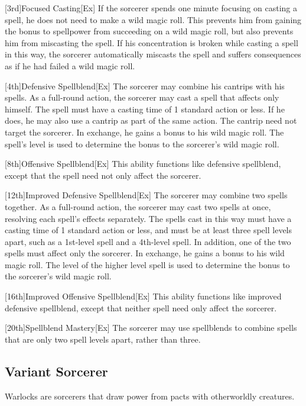 [3rd]{Focused Casting}[Ex]
If the sorcerer spends one minute focusing on casting a spell, he does not need to make a wild magic roll.
This prevents him from gaining the bonus to spellpower from succeeding on a wild magic roll, but also prevents him from miscasting the spell.
If his concentration is broken while casting a spell in this way, the sorcerer automatically miscasts the spell and suffers consequences as if he had failed a wild magic roll.

[4th]{Defensive Spellblend}[Ex]
The sorcerer may combine his cantrips with his spells.
As a full-round action, the sorcerer may cast a spell that affects only himself.
The spell must have a casting time of 1 standard action or less.
If he does, he may also use a cantrip as part of the same action.
The cantrip need not target the sorcerer.
In exchange, he gains a  bonus to his wild magic roll.
The spell's level is used to determine the bonus to the sorcerer's wild magic roll.

[8th]{Offensive Spellblend}[Ex]
This ability functions like defensive spellblend, except that the spell need not only affect the sorcerer.

[12th]{Improved Defensive Spellblend}[Ex]
The sorcerer may combine two spells together.
As a full-round action, the sorcerer may cast two spells at once, resolving each spell's effects separately.
The spells cast in this way must have a casting time of 1 standard action or less, and must be at least three spell levels apart, such as a 1st-level spell and a 4th-level spell.
In addition, one of the two spells must affect only the sorcerer.
In exchange, he gains a  bonus to his wild magic roll.
The level of the higher level spell is used to determine the bonus to the sorcerer's wild magic roll.

[16th]{Improved Offensive Spellblend}[Ex]
This ability functions like improved defensive spellblend, except that neither spell need only affect the sorcerer.

[20th]{Spellblend Mastery}[Ex]
The sorcerer may use spellblends to combine spells that are only two spell levels apart, rather than three.

\subsection{Variant Sorcerer}

Warlocks are sorcerers that draw power from pacts with otherworldly creatures.

